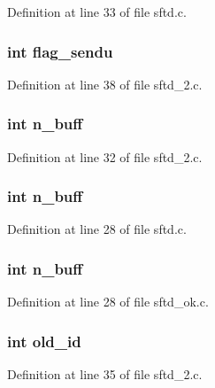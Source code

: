 Definition at line 33 of file sftd.c.

\hypertarget{group__SFTD_ga2154b2a39f2c03e7fd41ea4c626dfefc}{
\subsubsection[{flag\_\-sendu}]{\setlength{\rightskip}{0pt plus 5cm}int {\bf flag\_\-sendu}}}
\label{group__SFTD_ga2154b2a39f2c03e7fd41ea4c626dfefc}


Definition at line 38 of file sftd\_\-2.c.

\hypertarget{group__SFTD_gaeed3ab3cfaa81fc518da034ffff8576c}{
\subsubsection[{n\_\-buff}]{\setlength{\rightskip}{0pt plus 5cm}int {\bf n\_\-buff}}}
\label{group__SFTD_gaeed3ab3cfaa81fc518da034ffff8576c}


Definition at line 32 of file sftd\_\-2.c.

\hypertarget{group__SFTD_gaeed3ab3cfaa81fc518da034ffff8576c}{
\subsubsection[{n\_\-buff}]{\setlength{\rightskip}{0pt plus 5cm}int {\bf n\_\-buff}}}
\label{group__SFTD_gaeed3ab3cfaa81fc518da034ffff8576c}


Definition at line 28 of file sftd.c.

\hypertarget{group__SFTD_gaeed3ab3cfaa81fc518da034ffff8576c}{
\subsubsection[{n\_\-buff}]{\setlength{\rightskip}{0pt plus 5cm}int {\bf n\_\-buff}}}
\label{group__SFTD_gaeed3ab3cfaa81fc518da034ffff8576c}


Definition at line 28 of file sftd\_\-ok.c.

\hypertarget{group__SFTD_ga64595c5b8b55f94d3eb7503f07bc61a9}{
\subsubsection[{old\_\-id}]{\setlength{\rightskip}{0pt plus 5cm}int {\bf old\_\-id}}}
\label{group__SFTD_ga64595c5b8b55f94d3eb7503f07bc61a9}


Definition at line 35 of file sftd\_\-2.c.

